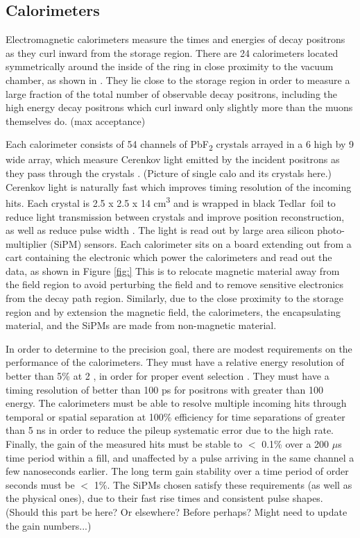 \subsection{Calorimeters}
\label{sec:Calorimeters}


Electromagnetic calorimeters measure the times and energies of decay positrons as they curl inward from the storage region. There are 24 calorimeters located symmetrically around the inside of the ring in close proximity to the vacuum chamber, as shown in . They lie close to the storage region in order to measure a large fraction of the total number of observable decay positrons, including the high energy decay positrons which curl inward only slightly more than the muons themselves do. (max acceptance)

Each calorimeter consists of 54 channels of PbF\textsubscript{2} crystals arrayed in a 6 high by 9 wide array, which measure Cerenkov light emitted by the incident positrons as they pass through the crystals \cite{Fienberg:2014kka}. (Picture of single calo and its crystals here.) Cerenkov light is naturally fast which improves timing resolution of the incoming hits. Each crystal is 2.5 x 2.5 x 14 cm\textsuperscript{3} and is wrapped in black Tedlar\textregistered\ foil to reduce light transmission between crystals and improve position reconstruction, as well as reduce pulse width \cite{Kaspar:2016ofv}. The light is read out by large area silicon photo-multiplier (SiPM) sensors. Each calorimeter sits on a board extending out from a cart containing the electronic which power the calorimeters and read out the data, as shown in Figure \ref{fig:} This is to relocate magnetic material away from the field region to avoid perturbing the field and to remove sensitive electronics from the decay path region. Similarly, due to the close proximity to the storage region and by extension the magnetic field, the calorimeters, the encapsulating material, and the SiPMs are made from non-magnetic material.

In order to determine \amu to the precision goal, there are modest requirements on the performance of the calorimeters. They must have a relative energy resolution of better than 5\% at 2 \GeV, in order for proper event selection \cite{TDR}. They must have a timing resolution of better than 100 ps for positrons with greater than 100 \MeV energy. The calorimeters must be able to resolve multiple incoming hits through temporal or spatial separation at 100\% efficiency for time separations of greater than 5 ns in order to reduce the pileup systematic error due to the high rate. Finally, the gain of the measured hits must be stable to $<$ 0.1\% over a 200 $\mu$s time period within a fill, and unaffected by a pulse arriving in the same channel a few nanoseconds earlier. The long term gain stability over a time period of order seconds must be $<$ 1\%. The SiPMs chosen satisfy these requirements (as well as the physical ones), due to their fast rise times and consistent pulse shapes. (Should this part be here? Or elsewhere? Before perhaps? Might need to update the gain numbers...)

